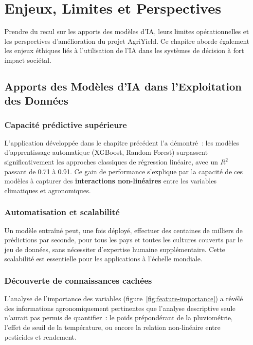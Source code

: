 \chapter{Enjeux, Limites et Perspectives}

\begin{objectifbox}
Prendre du recul sur les apports des modèles d'IA, leurs limites opérationnelles et les perspectives d'amélioration du projet AgriYield. Ce chapitre aborde également les enjeux éthiques liés à l'utilisation de l'IA dans les systèmes de décision à fort impact sociétal.
\end{objectifbox}

\section{Apports des Modèles d'IA dans l'Exploitation des Données}

\subsection{Capacité prédictive supérieure}

L'application développée dans le chapitre précédent l'a démontré~: les modèles d'apprentissage automatique (XGBoost, Random Forest) surpassent significativement les approches classiques de régression linéaire, avec un $R^2$ passant de 0.71 à 0.91. Ce gain de performance s'explique par la capacité de ces modèles à capturer des \textbf{interactions non-linéaires} entre les variables climatiques et agronomiques.

\subsection{Automatisation et scalabilité}

Un modèle entraîné peut, une fois déployé, effectuer des centaines de milliers de prédictions par seconde, pour tous les pays et toutes les cultures couverts par le jeu de données, sans nécessiter d'expertise humaine supplémentaire. Cette scalabilité est essentielle pour les applications à l'échelle mondiale.

\subsection{Découverte de connaissances cachées}

L'analyse de l'importance des variables (figure~\ref{fig:feature-importance}) a révélé des informations agronomiquement pertinentes que l'analyse descriptive seule n'aurait pas permis de quantifier~: le poids prépondérant de la pluviométrie, l'effet de seuil de la température, ou encore la relation non-linéaire entre pesticides et rendement.

